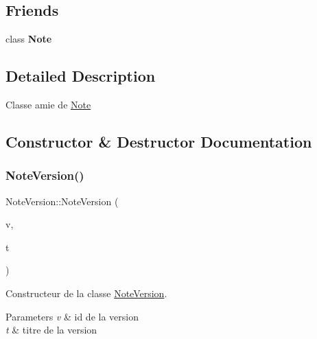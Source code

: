 \subsection*{Friends}
\begin{DoxyCompactItemize}
\item 
\mbox{\label{class_note_version_a93d7e72623acdfa5b079a11fbf2d9f9d}} 
class {\bfseries Note}
\end{DoxyCompactItemize}


\subsection{Detailed Description}
Classe amie de \hyperlink{class_note}{Note} 

\subsection{Constructor \& Destructor Documentation}
\mbox{\label{class_note_version_ad4404543d7a26d44a5a40690d262de5f}} 
\subsubsection{\texorpdfstring{Note\+Version()}{NoteVersion()}}
{\footnotesize\ttfamily Note\+Version\+::\+Note\+Version (\begin{DoxyParamCaption}\item[{unsigned int}]{v,  }\item[{const Q\+String \&}]{t }\end{DoxyParamCaption})}



Constructeur de la classe \hyperlink{class_note_version}{Note\+Version}. 


\begin{DoxyParams}{Parameters}
{\em v} & id de la version \\
\hline
{\em t} & titre de la version \\
\hline
\end{DoxyParams}
\mbox{\label{class_note_version_a84b32b9c97fa1de8b37b1170b9453f00}} 
